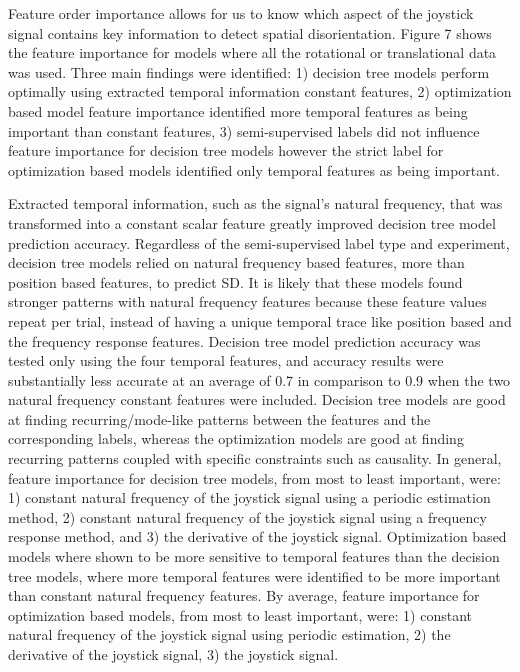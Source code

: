\documentclass[11pt, onecolumn]{article}
\begin{document}

Feature order importance allows for us to know which aspect of the joystick signal contains key information to detect spatial disorientation.  Figure 7 shows the feature importance for models where all the rotational or translational data was used.  Three main findings were identified: 1) decision tree models perform optimally using extracted temporal information constant features, 2) optimization based model feature importance identified more temporal features as being important than constant features, 3) semi-supervised labels did not influence feature importance for decision tree models however the strict label for optimization based models identified only temporal features as being important.

Extracted temporal information, such as the signal's natural frequency, that was transformed into a constant scalar feature greatly improved decision tree model prediction accuracy.  Regardless of the semi-supervised label type and experiment, decision tree models relied on natural frequency based features, more than position based features, to predict SD.  It is likely that these models found stronger patterns with natural frequency features because these feature values repeat per trial, instead of having a unique temporal trace like position based and the frequency response features. Decision tree model prediction accuracy was tested only using the four temporal features, and accuracy results were substantially less accurate at an average of 0.7 in comparison to 0.9 when the two natural frequency constant features were included.  Decision tree models are good at finding recurring/mode-like patterns between the features and the corresponding labels, whereas the optimization models are good at finding recurring patterns coupled with specific constraints such as causality.  In general, feature importance for decision tree models, from most to least important, were: 1) constant natural frequency of the joystick signal using a periodic estimation method, 2) constant natural frequency of the joystick signal using a frequency response method, and 3) the derivative of the joystick signal.  Optimization based models where shown to be more sensitive to temporal features than the decision tree models, where more temporal features were identified to be more important than constant natural frequency features.  By average, feature importance for optimization based models, from most to least important, were: 1) constant natural frequency of the joystick signal using periodic estimation, 2) the derivative of the joystick signal, 3) the joystick signal.
\end{document}
